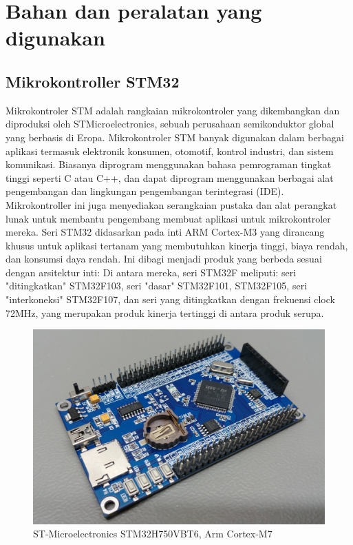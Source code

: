 \section{Bahan dan peralatan yang digunakan}

\subsection{Mikrokontroller STM32}
Mikrokontroler STM adalah rangkaian mikrokontroler yang dikembangkan dan diproduksi oleh STMicroelectronics, sebuah perusahaan semikonduktor global yang berbasis di Eropa. 
Mikrokontroler STM banyak digunakan dalam berbagai aplikasi termasuk elektronik konsumen, otomotif, kontrol industri, dan sistem komunikasi. Biasanya diprogram menggunakan 
bahasa pemrograman tingkat tinggi seperti C atau C++, dan dapat diprogram menggunakan berbagai alat pengembangan dan lingkungan pengembangan terintegrasi (IDE). 
Mikrokontroller ini juga menyediakan serangkaian pustaka dan alat perangkat lunak untuk membantu pengembang membuat aplikasi untuk mikrokontroler mereka. Seri STM32 didasarkan pada inti ARM Cortex-M3 yang dirancang khusus untuk aplikasi tertanam yang membutuhkan kinerja tinggi, biaya rendah, dan konsumsi daya rendah. Ini dibagi menjadi 
produk yang berbeda sesuai dengan arsitektur inti: Di antara mereka, seri STM32F meliputi: seri "ditingkatkan" STM32F103, seri "dasar" STM32F101, STM32F105, seri "interkoneksi" STM32F107, 
dan seri yang ditingkatkan dengan frekuensi clock 72MHz, yang merupakan produk kinerja tertinggi di antara produk serupa. 

\begin{figure} [ht] \centering
  \includegraphics[scale=0.35]{gambar/STM32H750VBT6_Generic_Development_Board.jpg}
  \caption{ST-Microelectronics STM32H750VBT6, Arm Cortex-M7}
  \label{fig:STM-Board}
\end{figure}

